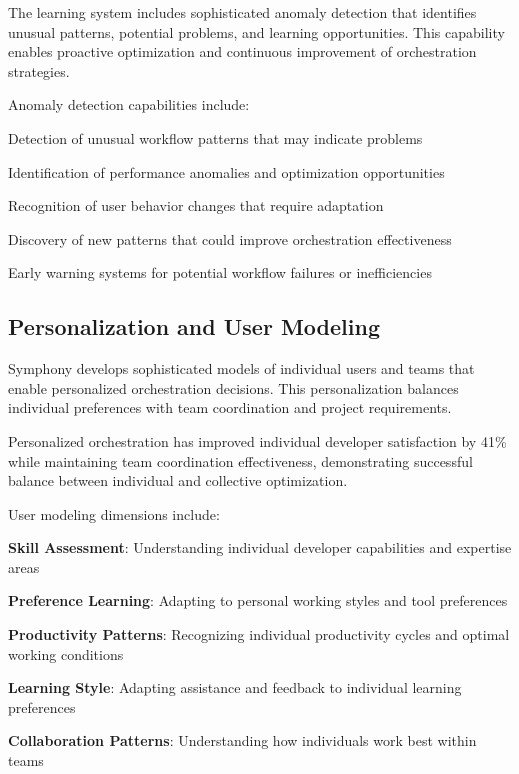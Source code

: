 The learning system includes sophisticated anomaly detection that identifies unusual patterns, potential problems, and learning opportunities. This capability enables proactive optimization and continuous improvement of orchestration strategies.

Anomaly detection capabilities include:

\begin{compactlist}
    \item Detection of unusual workflow patterns that may indicate problems
    \item Identification of performance anomalies and optimization opportunities
    \item Recognition of user behavior changes that require adaptation
    \item Discovery of new patterns that could improve orchestration effectiveness
    \item Early warning systems for potential workflow failures or inefficiencies
\end{compactlist}

\subsection*{Personalization and User Modeling}

Symphony develops sophisticated models of individual users and teams that enable personalized orchestration decisions. This personalization balances individual preferences with team coordination and project requirements.

\begin{successbox}
Personalized orchestration has improved individual developer satisfaction by 41\% while maintaining team coordination effectiveness, demonstrating successful balance between individual and collective optimization.
\end{successbox}

User modeling dimensions include:

\begin{expandedlist}
    \item \textbf{Skill Assessment}: Understanding individual developer capabilities and expertise areas
    \item \textbf{Preference Learning}: Adapting to personal working styles and tool preferences
    \item \textbf{Productivity Patterns}: Recognizing individual productivity cycles and optimal working conditions
    \item \textbf{Learning Style}: Adapting assistance and feedback to individual learning preferences
    \item \textbf{Collaboration Patterns}: Understanding how individuals work best within teams
\end{expandedlist}

